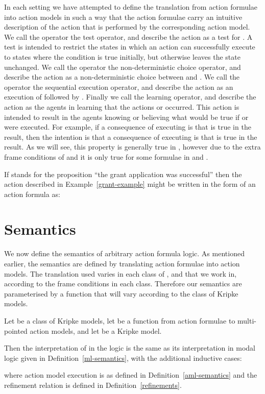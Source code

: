 \documentclass[twoside]{aiml14}
\begin{document}
  In each setting we have attempted to define the translation from action
  formulae into action models in such a way that the action formulae carry an
  intuitive description of the action that is performed by the corresponding
  action model. We call the  operator the test operator, and describe
  the action  as a test for . A test is intended to restrict
  the states in which an action can successfully execute to states where the
  condition  is true initially, but otherwise leaves the state unchanged. 
  We call the  operator the non-deterministic choice operator, and
  describe the action  as a non-deterministic choice
  between  and . We call the  operator the sequential
  execution operator, and describe the action  as an
  execution of  followed by .  Finally we call 
  the learning operator, and describe the action  as the agents in  learning that the actions  or
   occurred.  
  This action is intended to result in the agents 
  knowing or believing what would be true if  or  were executed.
  For example, if a consequence of executing  is that  is true in
  the result, then the intention is that a consequence of executing
   is that  is true in
  the result.  As we will see, this property is generally true in \logicAflK{},
  however due to the extra frame conditions of \classKFF{} and \classS{} it is
  only true for some formulae  in \logicAflKFF{} and \logicAflS{}.

  \begin{example}\label{grant-example-formula}
      If  stands for the proposition ``the grant application was
      successful'' then the action described in Example~\ref{grant-example}
      might be written in the form of an action formula as:
      
  \end{example}

  \section{Semantics}\label{semantics}

  We now define the semantics of arbitrary action formula logic. As mentioned
  earlier, the semantics are defined by translating action formulae into action
  models.  The translation used varies in each class of \classK{}, \classKFF{}
  and \classS{} that we work in, according to the frame conditions in each
  class.  Therefore our semantics are parameterised by a function
   that will vary according to the
  class of Kripke models.

  \begin{definition}
      Let \classC{} be a class of Kripke models, let  be a function from action formulae to
      multi-pointed action models, and let 
      be a Kripke model.

      Then the interpretation of  in the logic
       is the same as its interpretation in modal logic given in
      Definition~\ref{ml-semantics}, with the additional inductive cases:
      
      where action model execution  is as defined in Definition~\ref{aml-semantics} 
      and the refinement relation is defined in Definition~\ref{refinements}.
  \end{definition}
\end{document}
